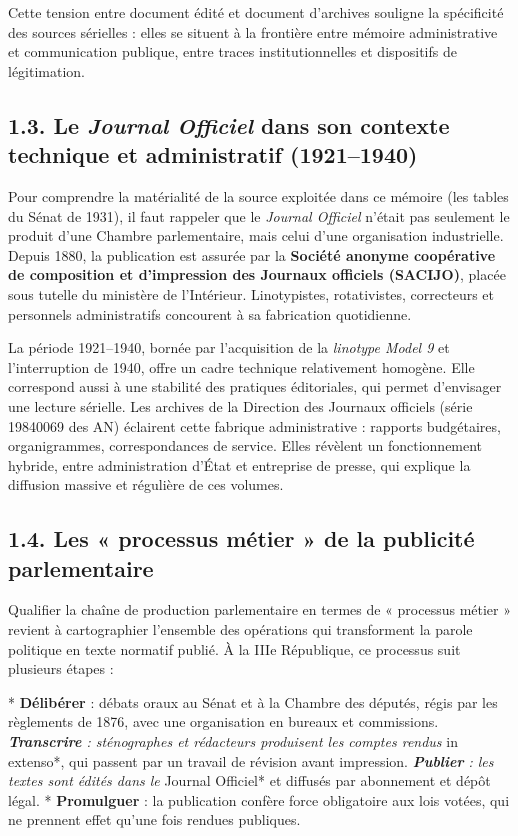 Cette tension entre document édité et document d’archives souligne la spécificité des sources sérielles : elles se situent à la frontière entre mémoire administrative et communication publique, entre traces institutionnelles et dispositifs de légitimation.

\subsection{1.3. Le \emph{Journal Officiel} dans son contexte technique et administratif (1921–1940)}

Pour comprendre la matérialité de la source exploitée dans ce mémoire (les tables du Sénat de 1931), il faut rappeler que le \emph{Journal Officiel} n’était pas seulement le produit d’une Chambre parlementaire, mais celui d’une organisation industrielle. Depuis 1880, la publication est assurée par la \textbf{Société anonyme coopérative de composition et d’impression des Journaux officiels (SACIJO)}, placée sous tutelle du ministère de l’Intérieur. Linotypistes, rotativistes, correcteurs et personnels administratifs concourent à sa fabrication quotidienne.

La période 1921–1940, bornée par l’acquisition de la \emph{linotype Model 9} et l’interruption de 1940, offre un cadre technique relativement homogène. Elle correspond aussi à une stabilité des pratiques éditoriales, qui permet d’envisager une lecture sérielle. Les archives de la Direction des Journaux officiels (série 19840069 des AN) éclairent cette fabrique administrative : rapports budgétaires, organigrammes, correspondances de service. Elles révèlent un fonctionnement hybride, entre administration d’État et entreprise de presse, qui explique la diffusion massive et régulière de ces volumes.

\subsection{1.4. Les « processus métier » de la publicité parlementaire}

Qualifier la chaîne de production parlementaire en termes de « processus métier » revient à cartographier l’ensemble des opérations qui transforment la parole politique en texte normatif publié. À la IIIe République, ce processus suit plusieurs étapes :

* \textbf{Délibérer} : débats oraux au Sénat et à la Chambre des députés, régis par les règlements de 1876, avec une organisation en bureaux et commissions.
\emph{ \textbf{Transcrire} : sténographes et rédacteurs produisent les comptes rendus }in extenso*, qui passent par un travail de révision avant impression.
\emph{ \textbf{Publier} : les textes sont édités dans le }Journal Officiel* et diffusés par abonnement et dépôt légal.
* \textbf{Promulguer} : la publication confère force obligatoire aux lois votées, qui ne prennent effet qu’une fois rendues publiques.


